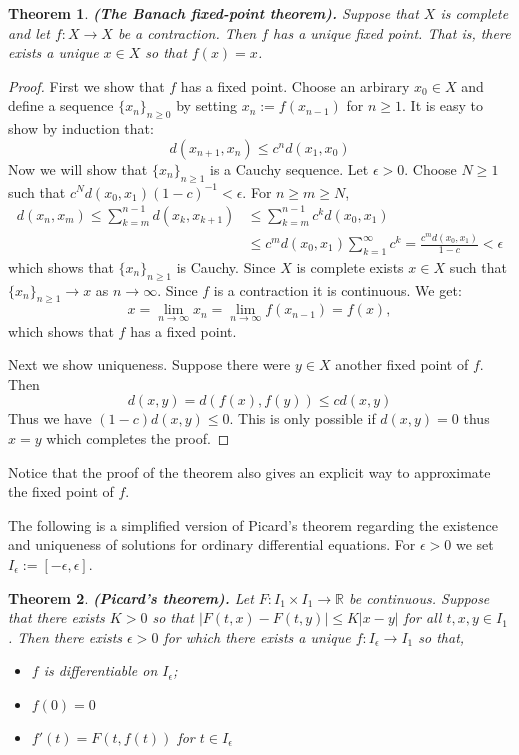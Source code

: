 \documentclass[11pt,a4paper]{article}
\theoremstyle{definition}
\theoremstyle{plain}
\newtheorem{theorem}{Theorem}[section]
\newcommand{\R}{\mathbb{R}}
\newcommand{\abs}[1]{\left\lvert #1\right\rvert}
\renewcommand{\tt}[1]{\textnormal{\textbf{(#1).}}} %
\begin{document}
	\begin{theorem}
		\tt{The Banach fixed-point theorem}
		Suppose that $X$ is complete
		and let $f \colon X \to X$ be a contraction. Then $f$ has a unique fixed 
		point. That is, there exists a unique $x \in X$ so that $f(x) = x$.
	\end{theorem}
	\begin{proof}
		First we show that $f$ has a fixed point. Choose an arbirary $x_0 \in X$
		and define a sequence $\{x_n\}_{n \geq 0}$ by setting
		$x_n := f(x_{n-1})$ for $n \geq 1$. It is easy to show by induction
		that:
		\[
			d(x_{n+1},x_{n}) \le c^n d(x_1,x_0)
		\]
		Now we will show that $\{x_n\}_{n \geq 1}$ is a Cauchy sequence.
		Let $\epsilon > 0$. Choose $N \geq 1$ such that
		$c^N d(x_0,x_1) (1-c)^{-1} < \epsilon$. For $n \geq m \geq N$,
		\begin{align*}
			d(x_n,x_m) \le 
			\sum_{k=m}^{n-1}{d(x_{k},x_{k+1})} &\le 
			\sum_{k=m}^{n-1}{c^k d(x_{0},x_{1})} \\ &\le
			c^m d(x_0,x_1) \sum_{k=1}^{\infty}{c^k} =
			\frac{c^m d(x_0,x_1)}{1-c} < \epsilon
		\end{align*}
		which shows that $\{x_n\}_{n \geq 1}$ is Cauchy. Since $X$ is complete
		exists $x \in X$ such that $\{x_n\}_{n \geq 1} \to x$ as $n \to \infty$.
		Since $f$ is a contraction it is continuous. We get:
		\[
			x = \lim_{n\to\infty}{x_n} = \lim_{n \to \infty}{f(x_{n-1})} = f(x),
		\]
		which shows that $f$ has a fixed point.
		
		Next we show uniqueness. Suppose there were $y \in X$ another fixed
		point of $f$. Then
		\[
			d(x,y) = d(f(x),f(y)) \le cd(x,y)
		\]
		Thus we have $(1-c)d(x,y) \le 0$. This is only possible if $d(x,y)=0$
		thus $x=y$ which completes the proof.
	\end{proof}
	Notice that the proof of the theorem also gives an explicit way to 
	approximate the fixed point of $f$.
	
	The following is a simplified version of Picard's theorem regarding the 
	existence and uniqueness of solutions for ordinary differential equations. 	
	For $\epsilon > 0$ we set $I_\epsilon := [−\epsilon, \epsilon]$.
	\begin{theorem}
		\tt{Picard's theorem}
		Let $F \colon I_1 \times I_1 \to \R$ be continuous. Suppose that there 
		exists $K > 0$ so that $\abs{F(t,x) − F(t,y)} ≤ K\abs{x − y}$ for all 
		$t, x, y \in I_1$. Then there exists $\epsilon > 0$ for which there 
		exists a unique $f \colon I_{\epsilon} \to I_{1}$ so that,
		\begin{itemize}
			\item $f$ is differentiable on $I_{\epsilon}$;
			\item $f(0)=0$
			\item $f'(t) = F(t,f(t))$ for $t \in I_{\epsilon}$
		\end{itemize}
	\end{theorem}
	
\end{document}
